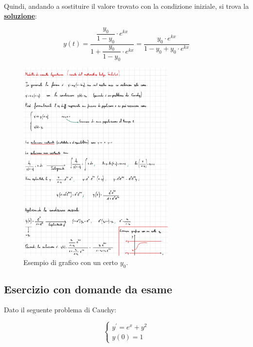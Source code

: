 \documentclass[a4paper]{article}
\begin{document}
	\newpage
	\noindent
	Quindi, andando a sostituire il valore trovato con la condizione iniziale, si trova la \textbf{\underline{soluzione}}:
	
	\begin{equation*}
		y\left(t\right) = \dfrac{\dfrac{y_{0}}{1 - y_{0}} \cdot e^{kx}}{1 + \dfrac{y_{0}}{1 - y_{0}} \cdot e^{kx}} = \dfrac{y_{0} \cdot e^{kx}}{1 - y_{0} + y_{0} \cdot e^{kx}}
	\end{equation*}

	\begin{figure}[!htp]
		\centering
		\includegraphics[width=0.7\textwidth]{img/modello_crescita_logaritmica-eg.pdf}
		\caption{Esempio di grafico con un certo $y_{0}$.}
	\end{figure}

	\newpage
	
	\subsection{Esercizio con domande da \textcolor{Red3}{esame}}
	
	Dato il seguente problema di Cauchy:
	
	\begin{equation*}
		\begin{cases}
			y^{'} = e^{x} + y^{2} \\
			y\left(0\right) = 1
		\end{cases}
	\end{equation*}
\end{document}
